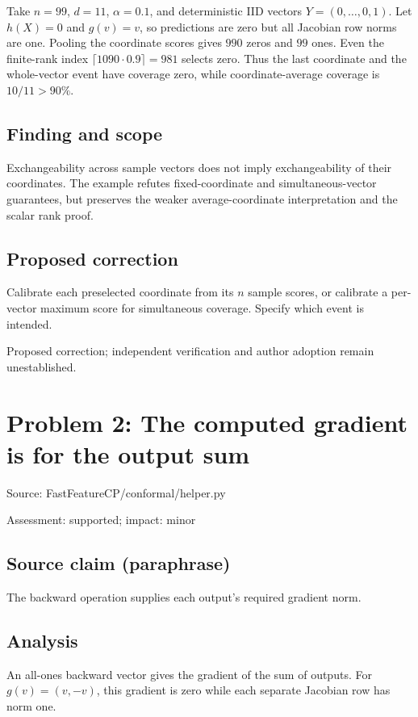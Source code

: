 \documentclass[11pt]{article}
\begin{document}
Take \(n=99\), \(d=11\), \(\alpha=0.1\), and deterministic IID vectors \(Y=(0,\ldots,0,1)\). Let \(h(X)=0\) and \(g(v)=v\), so predictions are zero but all Jacobian row norms are one. Pooling the coordinate scores gives \(990\) zeros and \(99\) ones. Even the finite-rank index \(\lceil1090\cdot0.9\rceil=981\) selects zero. Thus the last coordinate and the whole-vector event have coverage zero, while coordinate-average coverage is \(10/11>90\%\).

\subsection*{Finding and scope}

Exchangeability across sample vectors does not imply exchangeability of their coordinates. The example refutes fixed-coordinate and simultaneous-vector guarantees, but preserves the weaker average-coordinate interpretation and the scalar rank proof.

\subsection*{Proposed correction}

Calibrate each preselected coordinate from its \(n\) sample scores, or calibrate a per-vector maximum score for simultaneous coverage. Specify which event is intended.

Proposed correction; independent verification and author adoption remain unestablished.

\section*{Problem 2: The computed gradient is for the output sum}

Source: FastFeatureCP/conformal/helper.py

Assessment: supported; impact: minor

\subsection*{Source claim (paraphrase)}

The backward operation supplies each output’s required gradient norm.

\subsection*{Analysis}

An all-ones backward vector gives the gradient of the sum of outputs. For \(g(v)=(v,-v)\), this gradient is zero while each separate Jacobian row has norm one.
\end{document}
